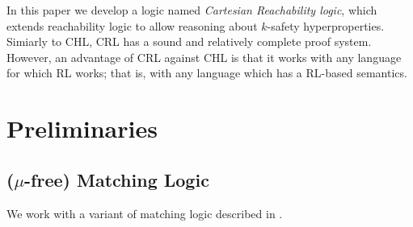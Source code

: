 \documentclass{article}
\begin{document}
In this paper we develop a logic named \emph{Cartesian Reachability logic}, which extends reachability logic
to allow reasoning about $k$-safety hyperproperties. Simiarly to CHL, CRL has a sound
and relatively complete proof system. However, an advantage of CRL against CHL is that it works with any language
for which RL works; that is, with any language which has a RL-based semantics.

\section{Preliminaries}

\subsection{($\mu$-free) Matching Logic}

We work with a variant of matching logic described in
\cite{StefanescuCMMSR19,RosuSCM13lics}.
\end{document}

